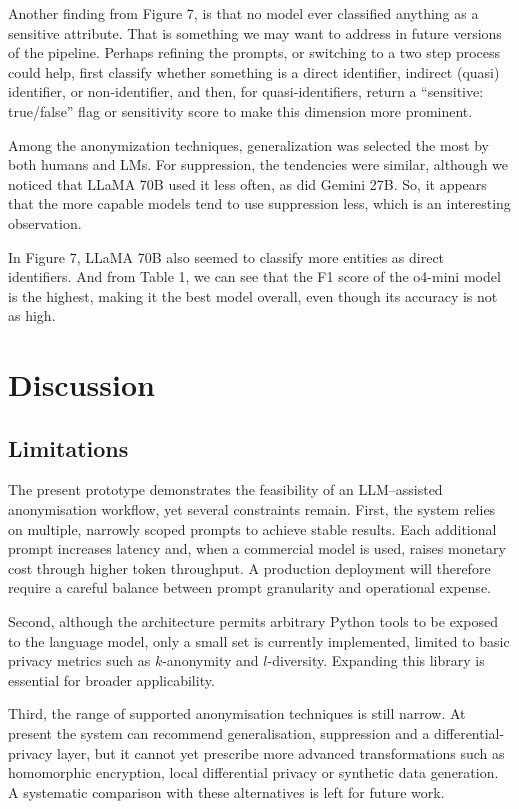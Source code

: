 \documentclass{article}
\begin{document}
Another finding from Figure 7, is that no model ever classified anything as a sensitive attribute. That is something we may want to address in future versions of the pipeline. Perhaps refining the prompts, or switching to a two step process could help, first classify whether something is a direct identifier, indirect (quasi) identifier, or non-identifier, and then, for quasi-identifiers, return a “sensitive: true/false” flag or sensitivity score to make this dimension more prominent.

Among the anonymization techniques, generalization was selected the most by both humans and LMs. For suppression, the tendencies were similar, although we noticed that LLaMA 70B used it less often, as did Gemini 27B. So, it appears that the more capable models tend to use suppression less, which is an interesting observation.

In Figure 7, LLaMA 70B also seemed to classify more entities as direct identifiers. And from Table 1, we can see that the F1 score of the o4-mini model is the highest, making it the best model overall, even though its accuracy is not as high.
\section{Discussion}
\subsection{Limitations}
\label{sec:limitations}

The present prototype demonstrates the feasibility of an LLM–assisted anonymisation workflow, yet several constraints remain.  
First, the system relies on multiple, narrowly scoped prompts to achieve stable results.  Each additional prompt increases latency and, when a commercial model is used, raises monetary cost through higher token throughput.  A production deployment will therefore require a careful balance between prompt granularity and operational expense.  

Second, although the architecture permits arbitrary Python tools to be exposed to the language model, only a small set is currently implemented, limited to basic privacy metrics such as $k$-anonymity and $l$-diversity.  Expanding this library is essential for broader applicability.  

Third, the range of supported anonymisation techniques is still narrow.  At present the system can recommend generalisation, suppression and a differential-privacy layer, but it cannot yet prescribe more advanced transformations such as homomorphic encryption, local differential privacy or synthetic data generation.  A systematic comparison with these alternatives is left for future work.  
\end{document}
